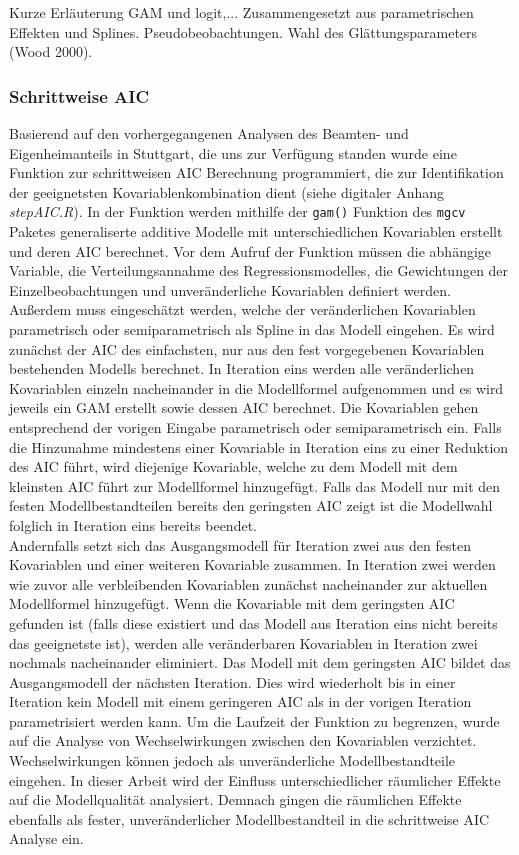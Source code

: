 \documentclass{Vorlage}
\begin{document}
Kurze Erläuterung GAM und logit,... Zusammengesetzt aus parametrischen Effekten und Splines. Pseudobeobachtungen. Wahl 
des Glättungsparameters  (Wood 2000).

\subsubsection{Schrittweise AIC}
Basierend auf den vorhergegangenen Analysen des Beamten- und Eigenheimanteils in Stuttgart, die uns zur Verfügung standen wurde eine Funktion zur schrittweisen AIC \cite{Akaike1981} Berechnung programmiert, die zur Identifikation der geeignetsten Kovariablenkombination dient (siehe digitaler Anhang \textit{stepAIC.R}). In der Funktion werden mithilfe der \texttt{gam()} Funktion des \texttt{mgcv} 
Paketes \cite{Wood2011} generaliserte additive Modelle mit unterschiedlichen Kovariablen erstellt und deren AIC 
berechnet. Vor dem Aufruf der Funktion müssen die abhängige Variable, die Verteilungsannahme des Regressionsmodelles, 
die Gewichtungen der Einzelbeobachtungen und unveränderliche Kovariablen definiert werden. Außerdem muss eingeschätzt 
werden, welche der veränderlichen Kovariablen parametrisch oder semiparametrisch als Spline in das Modell eingehen. Es 
wird zunächst der AIC des einfachsten, nur aus den fest vorgegebenen Kovariablen bestehenden Modells berechnet. In 
Iteration eins werden alle veränderlichen Kovariablen einzeln nacheinander in die Modellformel aufgenommen und es wird 
jeweils ein GAM erstellt sowie dessen AIC berechnet. Die Kovariablen gehen entsprechend der vorigen Eingabe parametrisch 
oder semiparametrisch ein. Falls die Hinzunahme mindestens einer Kovariable in Iteration eins zu einer Reduktion des AIC 
führt, wird diejenige Kovariable, welche zu dem Modell mit dem kleinsten AIC führt zur Modellformel hinzugefügt. Falls 
das Modell nur mit den festen Modellbestandteilen bereits den geringsten AIC zeigt ist die Modellwahl folglich in 
Iteration eins bereits beendet.\\ Andernfalls setzt sich das Ausgangsmodell für Iteration zwei aus den festen 
Kovariablen und einer weiteren Kovariable zusammen. In Iteration zwei werden wie zuvor alle verbleibenden Kovariablen 
zunächst nacheinander zur aktuellen Modellformel hinzugefügt. Wenn die Kovariable mit dem geringsten AIC gefunden ist 
(falls diese existiert und das Modell aus Iteration eins nicht bereits das geeignetste ist), werden alle veränderbaren 
Kovariablen in Iteration zwei nochmals nacheinander eliminiert. Das Modell mit dem geringsten AIC bildet das 
Ausgangsmodell der nächsten Iteration. Dies wird wiederholt bis in einer Iteration kein Modell mit einem geringeren AIC 
als in der vorigen Iteration parametrisiert werden kann. Um die Laufzeit der Funktion zu begrenzen, wurde auf die 
Analyse von Wechselwirkungen zwischen den Kovariablen verzichtet. Wechselwirkungen können jedoch als unveränderliche 
Modellbestandteile eingehen. In dieser Arbeit wird der Einfluss unterschiedlicher räumlicher Effekte auf die Modellqualität analysiert. Demnach gingen die räumlichen Effekte ebenfalls als fester, unveränderlicher Modellbestandteil in die schrittweise AIC Analyse ein.
\end{document}
